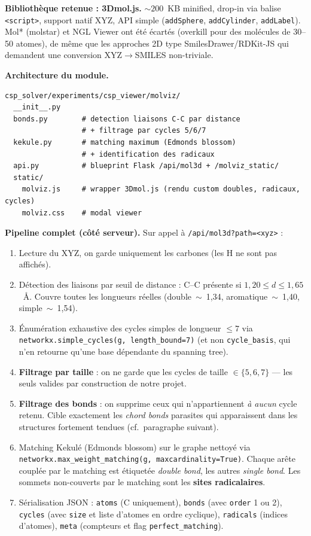 \textbf{Bibliothèque retenue : 3Dmol.js.} ${\sim}200$~KB minified, drop-in via
balise \texttt{<script>}, support natif XYZ, API simple
(\texttt{addSphere}, \texttt{addCylinder}, \texttt{addLabel}). Mol* (molstar) et
NGL Viewer ont été écartés (overkill pour des molécules de 30--50 atomes), de
même que les approches 2D type SmilesDrawer/RDKit-JS qui demandent une conversion
XYZ$\rightarrow$SMILES non-triviale.

\textbf{Architecture du module.}

\begin{lstlisting}[style=benzai]
csp_solver/experiments/csp_viewer/molviz/
  __init__.py
  bonds.py        # detection liaisons C-C par distance
                  # + filtrage par cycles 5/6/7
  kekule.py       # matching maximum (Edmonds blossom)
                  # + identification des radicaux
  api.py          # blueprint Flask /api/mol3d + /molviz_static/
  static/
    molviz.js     # wrapper 3Dmol.js (rendu custom doubles, radicaux, cycles)
    molviz.css    # modal viewer
\end{lstlisting}

\textbf{Pipeline complet (côté serveur).} Sur appel à
\texttt{/api/mol3d?path=<xyz>} :

\begin{enumerate}
  \item Lecture du XYZ, on garde uniquement les carbones (les H ne sont pas affichés).
  \item Détection des liaisons par seuil de distance : C--C présente si
    $1{,}20 \leq d \leq 1{,}65$~\AA. Couvre toutes les longueurs réelles
    (double~$\sim$~1{,}34, aromatique~$\sim$~1{,}40, simple~$\sim$~1{,}54).
  \item Énumération exhaustive des cycles simples de longueur $\leq 7$ via
    \texttt{networkx.simple\_cycles(g, length\_bound=7)} (et non
    \texttt{cycle\_basis}, qui n'en retourne qu'une base dépendante du
    spanning tree).
  \item \textbf{Filtrage par taille} : on ne garde que les cycles de taille
    $\in \{5,6,7\}$ --- les seuls valides par construction de notre projet.
  \item \textbf{Filtrage des bonds} : on supprime ceux qui n'appartiennent
    \emph{à aucun} cycle retenu. Cible exactement les \emph{chord bonds}
    parasites qui apparaissent dans les structures fortement tendues
    (cf.~paragraphe suivant).
  \item Matching Kekulé (Edmonds blossom) sur le graphe nettoyé via
    \texttt{networkx.max\_weight\_matching(g, maxcardinality=True)}. Chaque arête
    couplée par le matching est étiquetée \emph{double bond}, les autres
    \emph{single bond}. Les sommets non-couverts par le matching sont les
    \textbf{sites radicalaires}.
  \item Sérialisation JSON : \texttt{atoms} (C uniquement),
    \texttt{bonds} (avec \texttt{order} 1 ou 2), \texttt{cycles}
    (avec \texttt{size} et liste d'atomes en ordre cyclique),
    \texttt{radicals} (indices d'atomes), \texttt{meta}
    (compteurs et flag \texttt{perfect\_matching}).
\end{enumerate}

